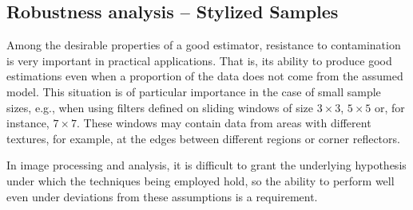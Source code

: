 \documentclass[twocolumn]{svjour3}
\newcommand{\at}[2][]{#1|_{#2}}
\begin{document}
%	
%	

%	

\subsection{Robustness analysis -- Stylized Samples}
\label{robustez}
Among the desirable properties of a good estimator, resistance to contamination is very important in practical applications. That is, its ability to produce good estimations even when a proportion of the data does not come from the assumed model. 
This situation is of particular importance in the case of small sample sizes, e.g., when using filters defined on sliding windows of size $3 \times 3$, $5 \times 5$ or, for instance, $7 \times 7$. 
These windows may contain data from areas with different textures, for example, at the edges between different regions or corner reflectors.

In image processing and analysis, it is difficult to grant the underlying hypothesis under which the techniques being employed hold, so the ability to perform well even under deviations from these assumptions is a requirement.
\end{document}
